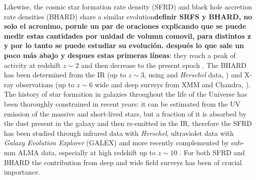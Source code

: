 
Likewise, the cosmic star formation rate density (SFRD) and black hole accretion rate densities (BHARD) share a similar evolution{\bf definir SRFS y BHARD, no solo el acronimo, pornle un par de oraciones explicando que se puede medir estas cantidades por unidad de volumn comovil, para distintos z y por lo tanto se puede estudiar su evolución. después lo que sale un poco más abajo y despues estas primeras líneas}: they reach a peak of activity at redshift $z\sim2$ and then decrease to the present epoch \citep{1998MNRAS.293L..49B, 2014MNRAS.439.2736D, 2014ARA&A..52..415M}.
The BHARD has been determined from the IR (up to $z\sim3$, using and \emph{Herschel} data, \citet{2014MNRAS.439.2736D}) and X-ray observations (up to $z\sim 6$ wide and deep surveys from XMM and Chandra, \citet{2018MNRAS.473.2378V}).
The history of star formation in galaxies throughout the life of the Universe has been thoroughly constrained in recent years: it can be estimated from the UV emission of the massive and short-lived stars, but a fraction of it is absorbed by the dust present in the galaxy and then re-emitted in the IR, therefore the SFRD has been studied through infrared data with \emph{Herschel}, ultraviolet data with \emph{Galaxy Evolution Explorer} (GALEX) \citep[see][for a review]{2014ARA&A..52..415M} and more recently complemented by sub-mm ALMA data, especially at high redshift up to $z\sim10$ \citep{2020ApJ...902..112B,2020A&A...643A...8G}. For both SFRD and BHARD the contribution from deep and wide field surveys has been of crucial importance.

